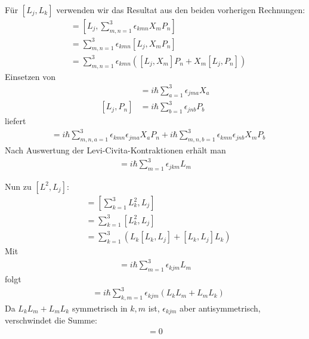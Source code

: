 \documentclass[11pt,a4paper]{scrartcl}
\begin{document}
\begin{enumerate}[label=(\alph*)]
\begin{tcolorbox}[title=Berechnung, breakable]
        Für $[L_j,L_k]$ verwenden wir das Resultat aus den beiden vorherigen Rechnungen:
        \begin{align*}
            [L_j,L_k] &= \left[L_j,\sum\limits_{m,n=1}^3 \epsilon_{kmn}X_mP_n\right]\\
            &= \sum\limits_{m,n=1}^3 \epsilon_{kmn}[L_j,X_mP_n]\\
            &= \sum\limits_{m,n=1}^3 \epsilon_{kmn}\left([L_j,X_m]P_n + X_m[L_j,P_n]\right)
        \end{align*}
        Einsetzen von
        \begin{align*}
            [L_j,X_m] &= i\hbar \sum\limits_{a=1}^3 \epsilon_{jma}X_a\\
            [L_j,P_n] &= i\hbar \sum\limits_{b=1}^3 \epsilon_{jnb}P_b
        \end{align*}
        liefert
        \begin{align*}
            [L_j,L_k]
            &= i\hbar \sum\limits_{m,n,a=1}^3 \epsilon_{kmn}\epsilon_{jma}X_aP_n
            + i\hbar \sum\limits_{m,n,b=1}^3 \epsilon_{kmn}\epsilon_{jnb}X_mP_b
        \end{align*}
        Nach Auswertung der Levi-Civita-Kontraktionen erhält man
        \begin{align*}
            [L_j,L_k] = i\hbar \sum\limits_{m=1}^3 \epsilon_{jkm}L_m
        \end{align*}

        Nun zu $[L^2,L_j]$:
        \begin{align*}
            [L^2,L_j] &= \left[\sum\limits_{k=1}^3 L_k^2,L_j\right]\\
            &= \sum\limits_{k=1}^3 [L_k^2,L_j]\\
            &= \sum\limits_{k=1}^3 \left(L_k[L_k,L_j] + [L_k,L_j]L_k\right)
        \end{align*}
        Mit
        \begin{align*}
            [L_k,L_j] = i\hbar \sum\limits_{m=1}^3 \epsilon_{kjm}L_m
        \end{align*}
        folgt
        \begin{align*}
            [L^2,L_j]
            &= i\hbar \sum\limits_{k,m=1}^3 \epsilon_{kjm}(L_kL_m + L_mL_k)
        \end{align*}
        Da $L_kL_m + L_mL_k$ symmetrisch in $k,m$ ist, $\epsilon_{kjm}$ aber antisymmetrisch, verschwindet die Summe:
        \begin{align*}
            [L^2,L_j] = 0
        \end{align*}


\end{tcolorbox}
\end{enumerate}
\end{document}

